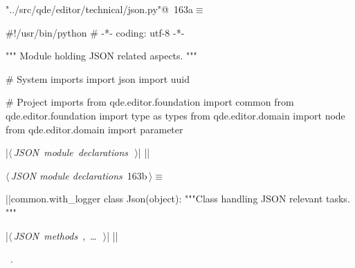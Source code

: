 \documentclass[%
    a4paper,    %
    justified,  %
    nobib,      %
    openany     %
]{tufte-book}
\begin{document}
\begin{flushleft} \small
\begin{minipage}{\linewidth}\label{scrap194}\raggedright\small
{} \verb@"../src/qde/editor/technical/json.py"@\nobreak\ {\footnotesize {163a}}$\equiv$
\vspace{-1ex}
\begin{pythoncode}
#!/usr/bin/python
# -*- coding: utf-8 -*-

""" Module holding JSON related aspects.
"""

# System imports
import json
import uuid

# Project imports
from qde.editor.foundation import common
from qde.editor.foundation import type as types
from qde.editor.domain import node
from qde.editor.domain import parameter


|\hbox{$\langle\,${\itshape JSON module declarations}\nobreak\ {\footnotesize {}}$\,\rangle$}|
|\NWsep|
\end{pythoncode}
\vspace{1.5ex}
\footnotesize
\begin{list}{}{\setlength{\itemsep}{-\parsep}\setlength{\itemindent}{-\leftmargin}}

\item{}
\end{list}
\end{minipage}\vspace{4ex}
\end{flushleft}
\begin{flushleft} \small
\begin{minipage}{\linewidth}\label{scrap195}\raggedright\small
{} $\langle\,${\itshape JSON module declarations}\nobreak\ {\footnotesize {163b}}$\,\rangle\equiv$
\vspace{-1ex}
\begin{pythoncode}
|\normalfont{}\fontfamily{}|common.with_logger
class Json(object):
    """Class handling JSON relevant tasks.
    """

    |\hbox{$\langle\,${\itshape JSON methods}\nobreak\ {\footnotesize {}, \ldots\ }$\,\rangle$}|
|\NWsep|
\end{pythoncode}
\vspace{1.5ex}
\footnotesize
\begin{list}{}{\setlength{\itemsep}{-\parsep}\setlength{\itemindent}{-\leftmargin}}
\item \NWtxtMacroRefIn\ .

\item{}
\end{list}
\end{minipage}\vspace{4ex}
\end{flushleft}
\end{document}
